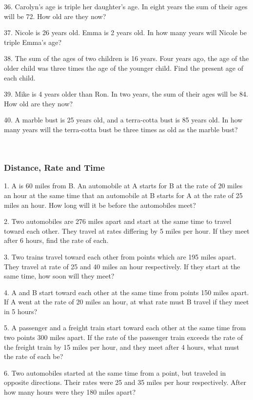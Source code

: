 \documentclass[11pt]{book}
\theoremstyle{definition}  %
\begin{document}
36. Carolyn's age is triple her daughter's age. In eight years the sum of
their ages will be 72. How old are they now?

37. Nicole is 26 years old. Emma is 2 years old. In how many years will Nicole
be triple Emma's age?

38. The sum of the ages of two children is 16 years. Four years ago, the age
of the older child was three times the age of the younger child.
Find the present age of each child.

39. Mike is 4 years older than Ron. In two years, the sum of their ages will
be 84. How old are they now?

40. A marble bust is 25 years old, and a terra-cotta bust is 85 years old. In
how many years will the terra-cotta bust be three times as old
as the marble bust?

\vspace{4in}
~


\pagebreak

	\subsubsection{Distance, Rate and Time}\par

1. A is 60 miles from B. An automobile at A starts for B at the rate of 20
miles an hour at the same time that an automobile at B starts
for A at the rate of 25 miles an hour. How long will it be
before the automobiles meet?

2. Two automobiles are 276 miles apart and start at the same time to travel toward each other. They travel at rates differing by 5
miles per hour. If they meet after 6 hours, find the rate of
each.

3. Two trains travel toward each other from points which are 195 miles apart.
They travel at rate of 25 and 40 miles an hour respectively.
If they start at the same time, how soon will they meet?

4. A and B start toward each other at the same time from points 150 miles
apart. If A went at the rate of 20 miles an hour, at what rate must B
travel if they meet in 5 hours?

5. A passenger and a freight train start toward each other at the same time
from two points 300 miles apart. If the rate of the passenger train
exceeds the rate of the freight train by 15 miles per hour, and
they meet after 4 hours, what must the rate of each be?

6. Two automobiles started at the same time from a point, but traveled in opposite directions. Their rates were 25 and 35 miles
per hour respectively. After how many hours were they 180
miles apart?
\end{document}
